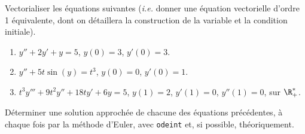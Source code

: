 \question{}
Vectorialiser les équations suivantes (\emph{i.e.} donner une équation vectorielle d'ordre 1 équivalente, dont on détaillera la construction de la variable et la condition initiale).
  \begin{enumerate}
    \item $y'' + 2y' + y = 5$, $y(0) = 3$, $y'(0) = 3$.
    \item $y'' + 5t \sin(y) = t^3$, $y(0) = 0$, $y'(0) = 1$.
    \item $t^3y''' + 9t^2y'' + 18ty' + 6y = 5$, $y(1) = 2$, $y'(1) = 0$, $y''(1) = 0$, sur $\R_+^\ast$.  
  \end{enumerate}

\question{}
  Déterminer une solution approchée de chacune des équations précédentes, à chaque fois par la méthode d'Euler, avec \texttt{odeint} et, si possible, théoriquement.